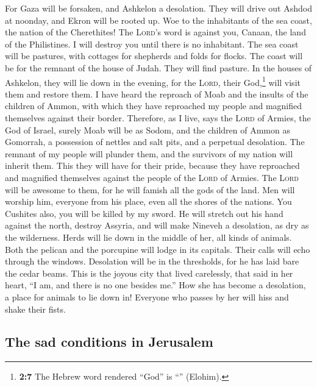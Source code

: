  For Gaza will be forsaken, and Ashkelon a desolation.
They will drive out Ashdod at noonday, and Ekron will be rooted up.
 Woe to the inhabitants of the sea coast, the nation of
the Cherethites! The \textsc{Lord}'s word is against you, Canaan, the
land of the Philistines. I will destroy you until there is no
inhabitant.  The sea coast will be pastures, with cottages
for shepherds and folds for flocks.  The coast will be for
the remnant of the house of Judah. They will find pasture. In the houses
of Ashkelon, they will lie down in the evening, for the \textsc{Lord},
their God,\footnote{\textbf{2:7} The Hebrew word rendered ``God'' is
  ``'' (Elohim).} will visit them and restore them.
 I have heard the reproach of Moab and the insults of the
children of Ammon, with which they have reproached my people and
magnified themselves against their border.  Therefore, as
I live, says the \textsc{Lord} of Armies, the God of Israel, surely Moab
will be as Sodom, and the children of Ammon as Gomorrah, a possession of
nettles and salt pits, and a perpetual desolation. The remnant of my
people will plunder them, and the survivors of my nation will inherit
them.  This they will have for their pride, because they
have reproached and magnified themselves against the people of the
\textsc{Lord} of Armies.  The \textsc{Lord} will be
awesome to them, for he will famish all the gods of the land. Men will
worship him, everyone from his place, even all the shores of the
nations.  You Cushites also, you will be killed by my
sword.  He will stretch out his hand against the north,
destroy Assyria, and will make Nineveh a desolation, as dry as the
wilderness.  Herds will lie down in the middle of her,
all kinds of animals. Both the pelican and the porcupine will lodge in
its capitals. Their calls will echo through the windows. Desolation will
be in the thresholds, for he has laid bare the cedar beams.
 This is the joyous city that lived carelessly, that said
in her heart, ``I am, and there is no one besides me.'' How she has
become a desolation, a place for animals to lie down in! Everyone who
passes by her will hiss and shake their fists.

\hypertarget{the-sad-conditions-in-jerusalem}{%
\subsection{The sad conditions in
Jerusalem}\label{the-sad-conditions-in-jerusalem}}

